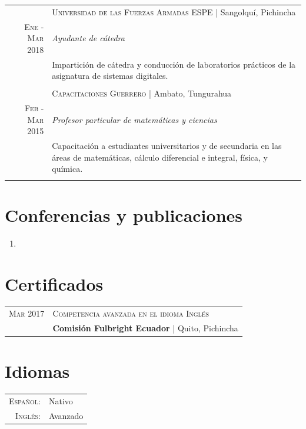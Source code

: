 \documentclass[a4paper,10.9pt]{article}
\begin{document}
\begin{tabular}{r|p{11cm}}
&\textsc{Universidad de las Fuerzas Armadas ESPE} | Sangolquí, Pichincha \\
\textsc{Ene - Mar 2018}&\emph{Ayudante de cátedra}\\
&\footnotesize{Impartición de cátedra y conducción de laboratorios prácticos de la asignatura de sistemas digitales.}\\ 
\multicolumn{2}{c}{} \\
&\textsc{Capacitaciones Guerrero} | Ambato, Tungurahua \\
\textsc{Feb - Mar 2015}&\emph{Profesor particular de matemáticas y ciencias}\\&
\footnotesize{Capacitación a estudiantes universitarios y de secundaria en las áreas de matemáticas, cálculo diferencial e integral, física, y química.}\\ &
\end{tabular}

\section{Conferencias y publicaciones}
\begin{enumerate}
	\item {}
\end{enumerate}
	



\section{Certificados}
\begin{tabular}{r|l}	
 \textsc{Mar} 2017 &  \textsc{Competencia avanzada en el idioma Inglés}\\&
 \textbf{Comisión Fulbright Ecuador} | Quito, Pichincha\\

\end{tabular}

\section{Idiomas}
\begin{tabular}{rl}
 \textsc{Español:}&Nativo\\
\textsc{Inglés:}&Avanzado\\
\end{tabular}
\end{document}
